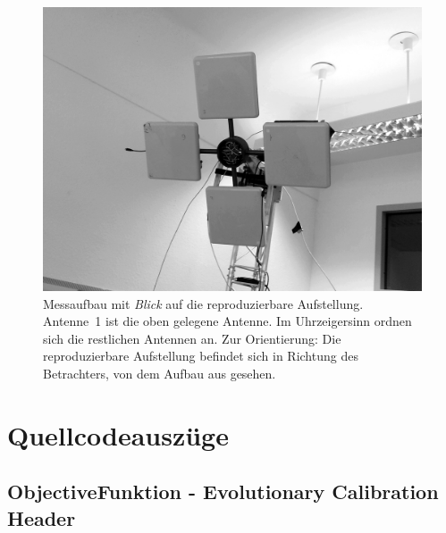 \begin{appendix}
\begin{figure}[h!]
         \label{fig:Spider1}
\end{figure}
\newpage
%
\begin{figure}[h!]
 \centering
         \includegraphics[width=\textwidth]{img/4AntennaSetup.png}
         \caption[Übersicht Kalibrieraufbau]{Messaufbau mit \textit{Blick} auf die reproduzierbare Aufstellung. Antenne~1 ist die oben gelegene Antenne. Im Uhrzeigersinn ordnen sich die restlichen Antennen an. Zur Orientierung: Die reproduzierbare Aufstellung befindet sich in Richtung des Betrachters, von dem Aufbau aus gesehen.}
         \label{fig:Spider_setup1}
\end{figure}
\newpage
%
\chapter{Quellcodeauszüge}
\section{ObjectiveFunktion - Evolutionary Calibration Header}

\lstset{
	basicstyle=\scriptsize,
	language=C++,
	numbers=left,
	breaklines=true,
	frame=tbrl,
	breakatwhitespace=false
	breaklines=true,  
	xleftmargin=1cm,
	tabsize=2,
	showstringspaces=false}


\end{appendix}
